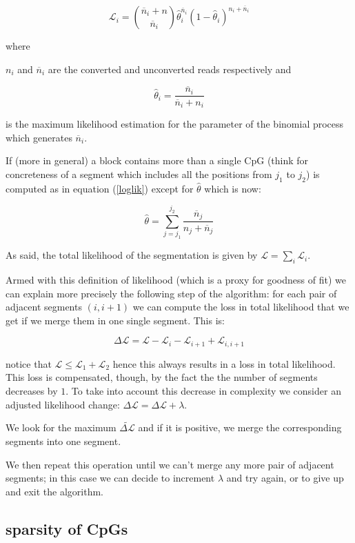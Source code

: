 \documentclass[11pt]{amsart}
\newcommand{\lik}{\ensuremath{\mathcal{L}}}
\begin{document}
\[\lik_i={\overline{n}_i+n \choose \overline{n}_i}
	\hat{\theta}_i^{\overline{n}_i}(1-\hat{\theta}_i)^{n_i+\overline{n}_i}\]
\label{loglik}

where

$n_i$ and $\overline{n}_i$ are the converted and unconverted reads respectively 
and

\[\hat{\theta}_i=\frac{\overline{n}_i}{\overline{n}_i+n_i}\]

is the maximum likelihood estimation for the parameter of the binomial process 
which generates $\overline{n}_i$.

If (more in general) a block contains  more than a single CpG  
(think for concreteness of a segment which includes all the positions from 
$j_1$ to $j_2$) is 
computed as in equation (\ref{loglik}) except for $\hat{\theta}$ which is now:

\[
\hat{\theta}=\sum_{j=j_1}^{j_2} \frac{\overline{n}_j}{n_j+\overline{n}_j}
\]

As said, the total likelihood of the segmentation is given by 
$\mathcal{L}=\sum_i\mathcal{L}_i$.

Armed with this definition of likelihood (which is a proxy for goodness of fit) 
we can explain more precisely the following step of the algorithm:
for each pair of adjacent segments $(i,i+1)$ we can compute the loss in 
total likelihood that we get if we merge them
in one single segment. This is:

\[\Delta \lik=\lik-\mathcal{L}_i-\mathcal{L}_{i+1}+\mathcal{L}_{i,i+1}\]

notice that $\mathcal{L} \leq \mathcal{L}_1+\mathcal{L}_2$ hence this always 
results in a loss in total 
likelihood. This loss is compensated, though, by the fact the the number 
of segments decreases by $1$. To take into account this decrease in 
complexity we consider an adjusted likelihood change:
$\Delta \lik = \Delta \lik+\lambda$.

We look for the maximum $\tilde{\Delta \lik}$ and if it is positive, we merge the
corresponding segments into one segment.

We then repeat this operation until we can't merge any more pair of adjacent 
segments; in this case we can decide to increment 
$\lambda$ and try again, or to give up and exit the algorithm.

\subsection{sparsity of CpGs}
\end{document}
